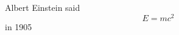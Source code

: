 \documentclass[preview]{standalone}
\begin{document}
\begin{center}
Albert Einstein said \[E=mc^2\] in 1905
\end{center}
\end{document}

